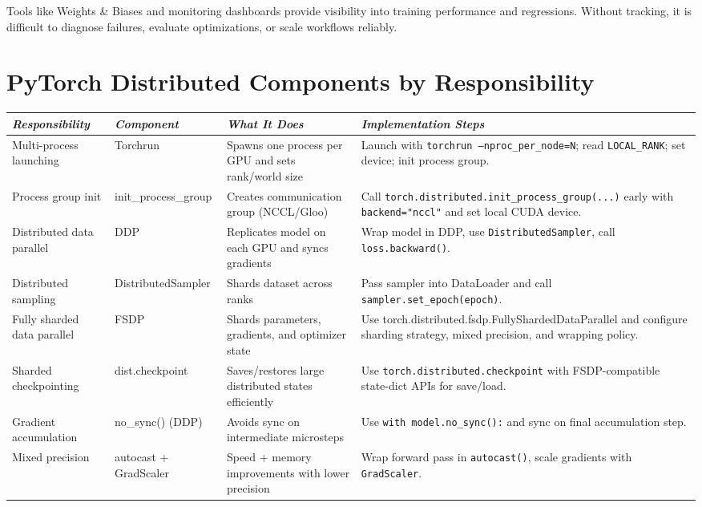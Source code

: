 \documentclass[12pt]{article}
\let\origtextbf\textbf
\renewcommand{\textbf}[1]{\origtextbf{\textit{#1}}}
\begin{document}
Tools like Weights \& Biases and monitoring dashboards provide visibility into training performance and regressions. Without tracking, it is difficult to diagnose failures, evaluate optimizations, or scale workflows reliably.

\section{PyTorch Distributed Components by Responsibility}

{\scriptsize
\setlength{\tabcolsep}{3pt}
\begin{tabularx}{0.98\textwidth}{|>{\raggedright\arraybackslash}p{2.2cm}|>{\raggedright\arraybackslash}p{2.3cm}|>{\raggedright\arraybackslash}p{2.5cm}|>{\raggedright\arraybackslash}X|}
\hline
\textbf{Responsibility} & \textbf{Component} & \textbf{What It Does} & \textbf{Implementation Steps} \\
\hline
Multi-process launching & Torchrun & Spawns one process per GPU and sets rank/world size & Launch with \texttt{torchrun --nproc\_per\_node=N}; read \texttt{LOCAL\_RANK}; set device; init process group. \\
\hline
Process group init & init\_process\_group & Creates communication group (NCCL/Gloo) & Call \texttt{torch.distributed.init\_process\_group(...)} early with \texttt{backend="nccl"} and set local CUDA device. \\
\hline
Distributed data parallel & DDP & Replicates model on each GPU and syncs gradients & Wrap model in DDP, use \texttt{DistributedSampler}, call \texttt{loss.backward()}. \\
\hline
Distributed sampling & DistributedSampler & Shards dataset across ranks & Pass sampler into DataLoader and call \texttt{sampler.set\_epoch(epoch)}. \\
\hline
Fully sharded data parallel & FSDP & Shards parameters, gradients, and optimizer state & Use torch.distributed.fsdp.FullyShardedDataParallel and configure sharding strategy, mixed precision, and wrapping policy. \\
\hline
Sharded checkpointing & dist.checkpoint & Saves/restores large distributed states efficiently & Use \texttt{torch.distributed.checkpoint} with FSDP-compatible state-dict APIs for save/load. \\
\hline
Gradient accumulation & no\_sync() (DDP) & Avoids sync on intermediate microsteps & Use \texttt{with model.no\_sync():} and sync on final accumulation step. \\
\hline
Mixed precision & autocast + GradScaler & Speed + memory improvements with lower precision & Wrap forward pass in \texttt{autocast()}, scale gradients with \texttt{GradScaler}. \\

\end{tabularx}}
\end{document}
